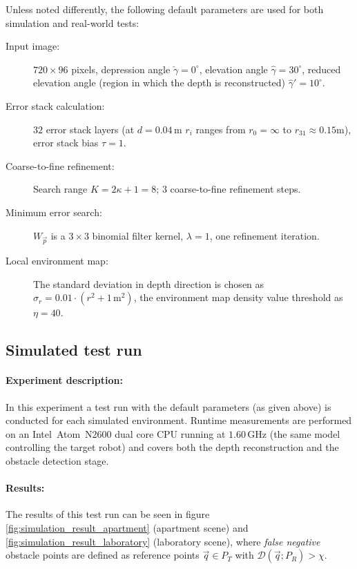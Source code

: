 Unless noted differently, the following default parameters are used for both simulation and real-world tests:
\begin{description}
 \item[Input image:] $720 \times 96$ pixels, depression angle $\check \gamma = 0^\circ$, elevation angle $\hat \gamma = 30^\circ$, reduced elevation angle (region in which the depth is reconstructed) $\hat \gamma' = 10^\circ$.
 \item[Error stack calculation:] $32$ error stack layers (at $d = 0.04 \, \mathrm{m}$ $r_i$ ranges from $r_0 = \infty$ to $r_{31} \approx 0.15 \mathrm{m}$), error stack bias $\tau = 1$.
 \item[Coarse-to-fine refinement:] Search range $K = 2 \kappa + 1 = 8$; $3$ coarse-to-fine refinement steps.
 \item[Minimum error search:] $W_\vec{p}$ is a $3 \times 3$ binomial filter kernel, $\lambda = 1$, one refinement iteration.
 \item[Local environment map:] The standard deviation in depth direction is chosen as $\sigma_r = 0.01 \cdot (r^2 + 1 \, \mathrm{m}^2)$, the environment map density value threshold as $\eta = 40$.
\end{description}

\subsection{Simulated test run}

\paragraph{Experiment description:} In this experiment a test run with the default parameters (as given above) is conducted for each simulated environment. Runtime measurements are performed on an Intel\textregistered\ Atom\texttrademark\ N2600 dual core CPU running at $1{.}60 \, \mathrm{GHz}$ (the same model controlling the target robot) and covers both the depth reconstruction and the obstacle detection stage.

\paragraph{Results:} The results of this test run can be seen in figure \ref{fig:simulation_result_apartment} (apartment scene) and \ref{fig:simulation_result_laboratory} (laboratory scene), where \textit{false negative} obstacle points are defined as reference points $\vec q \in P_T$ with $\mathcal{D}(\vec q; P_R) > \chi$.


